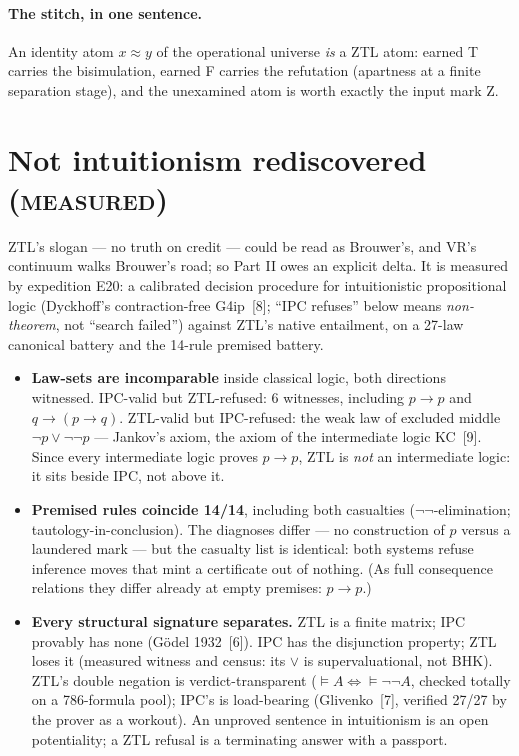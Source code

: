 \documentclass[11pt]{article}
\theoremstyle{remark}
\newcommand{\eq}{\approx}
\newcommand{\vT}{\textsf{T}}
\newcommand{\vF}{\textsf{F}}
\newcommand{\vZ}{\textsf{Z}}
\newcommand{\MEASURED}{\textsc{measured}}
\begin{document}
\paragraph{The stitch, in one sentence.} An identity atom $x \eq y$ of the
operational universe \emph{is} a ZTL atom: earned \vT{} carries the
bisimulation, earned \vF{} carries the refutation (apartness at a finite
separation stage), and the unexamined atom is worth exactly the input mark
\vZ{}.

\section{Not intuitionism rediscovered (\MEASURED)}
\label{sec:delta}

ZTL's slogan --- no truth on credit --- could be read as Brouwer's, and VR's
continuum walks Brouwer's road; so Part II owes an explicit delta. It is
measured by expedition E20: a calibrated decision procedure for
intuitionistic propositional logic (Dyckhoff's contraction-free
G4ip~[8]; ``IPC refuses'' below means \emph{non-theorem}, not
``search failed'') against ZTL's native entailment, on a 27-law canonical
battery and the 14-rule premised battery.

\begin{itemize}
\item \textbf{Law-sets are incomparable} inside classical logic, both
directions witnessed. IPC-valid but ZTL-refused: 6 witnesses, including
$p \to p$ and $q \to (p\to q)$. ZTL-valid but IPC-refused: the weak law of
excluded middle $\lnot p \lor \lnot\lnot p$ --- Jankov's axiom, the axiom of
the intermediate logic KC~[9]. Since every intermediate logic
proves $p\to p$, ZTL is \emph{not} an intermediate logic: it sits beside
IPC, not above it.
\item \textbf{Premised rules coincide 14/14}, including both casualties
($\lnot\lnot$-elimination; tautology-in-conclusion). The diagnoses differ
--- no construction of $p$ versus a laundered mark --- but the casualty list
is identical: both systems refuse inference moves that mint a certificate
out of nothing. (As full consequence relations they differ already at empty
premises: $p \to p$.)
\item \textbf{Every structural signature separates.} ZTL is a finite matrix;
IPC provably has none (G\"odel 1932~[6]). IPC has the disjunction
property; ZTL loses it (measured witness and census: its $\lor$ is
supervaluational, not BHK). ZTL's double negation is verdict-transparent
($\models A \iff \models \lnot\lnot A$, checked totally on a 786-formula
pool); IPC's is load-bearing (Glivenko~[7], verified 27/27 by
the prover as a workout). An unproved sentence in intuitionism is an open
potentiality; a ZTL refusal is a terminating answer with a passport.
\end{itemize}
\end{document}
